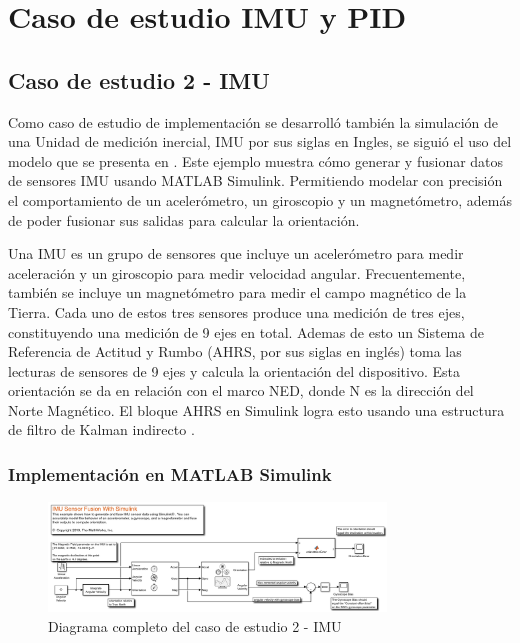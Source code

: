 \chapter{Caso de estudio IMU y PID}
\label{ch:especifico3}

\section{Caso de estudio 2 - IMU}

Como caso de estudio de implementación se desarrolló también la simulación de una Unidad de medición inercial, IMU por sus siglas en Ingles, se siguió el uso del modelo que se presenta en \cite{mathworks2024imu}. Este ejemplo muestra cómo generar y fusionar datos de sensores IMU usando MATLAB Simulink. Permitiendo modelar con precisión el comportamiento de un acelerómetro, un giroscopio y un magnetómetro, además de poder fusionar sus salidas para calcular la orientación.

Una IMU es un grupo de sensores que incluye un acelerómetro para medir aceleración y un giroscopio para medir velocidad angular. Frecuentemente, también se incluye un magnetómetro para medir el campo magnético de la Tierra. Cada uno de estos tres sensores produce una medición de tres ejes, constituyendo una medición de 9 ejes en total. Ademas de esto un Sistema de Referencia de Actitud y Rumbo (AHRS, por sus siglas en inglés) toma las lecturas de sensores de 9 ejes y calcula la orientación del dispositivo. Esta orientación se da en relación con el marco NED, donde N es la dirección del Norte Magnético. El bloque AHRS en Simulink logra esto usando una estructura de filtro de Kalman indirecto \cite{mathworks2024imu}.

\subsection{Implementación en MATLAB Simulink}

\begin{figure}[h!]
    \centering
    \includegraphics[width=0.8\textwidth]{fig/Capitulo5/Caso_de_estudio_IMU/FULL_IMU.png}
    \caption{Diagrama completo del caso de estudio 2 - IMU \cite{mathworks2024imu}}
    \label{fig:caso_de_estudio_2_IMU}
\end{figure}


